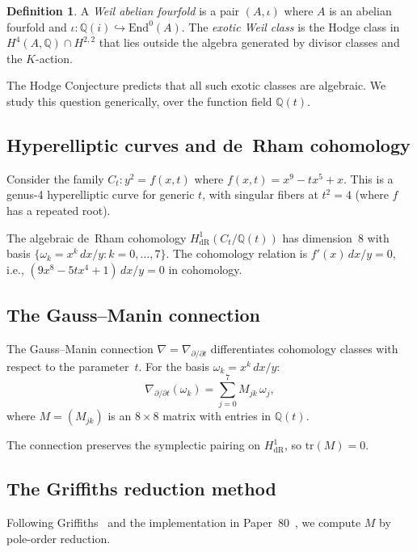 \documentclass[11pt]{article}
\theoremstyle{plain}
\theoremstyle{definition}
\newtheorem{definition}[theorem]{Definition}
\theoremstyle{remark}
\newcommand{\Q}{\mathbb{Q}}
\newcommand{\End}{\mathrm{End}}
\newcommand{\tr}{\mathrm{tr}}
\newcommand{\HdR}{H^1_{\mathrm{dR}}}
\begin{document}
\begin{definition}
A \emph{Weil abelian fourfold} is a pair $(A, \iota)$ where $A$ is
an abelian fourfold and $\iota\colon \Q(i) \hookrightarrow \End^0(A)$.
The \emph{exotic Weil class} is the Hodge class in
$H^4(A, \Q) \cap H^{2,2}$ that lies outside the algebra generated
by divisor classes and the $K$-action.
\end{definition}

The Hodge Conjecture predicts that all such exotic classes are
algebraic. We study this question generically, over the function
field $\Q(t)$.

\subsection{Hyperelliptic curves and de~Rham cohomology}

Consider the family $C_t\colon y^2 = f(x,t)$ where
$f(x,t) = x^9 - tx^5 + x$. This is a genus-4 hyperelliptic curve
for generic $t$, with singular fibers at $t^2 = 4$ (where $f$ has
a repeated root).

The algebraic de~Rham cohomology $\HdR(C_t/\Q(t))$ has dimension~8
with basis $\{\omega_k = x^k\, dx/y : k = 0,\ldots,7\}$. The
cohomology relation is $f'(x)\, dx/y = 0$, i.e.,
$(9x^8 - 5tx^4 + 1)\, dx/y = 0$ in cohomology.

\subsection{The Gauss--Manin connection}\label{sec:GM}

The Gauss--Manin connection $\nabla = \nabla_{\partial/\partial t}$
differentiates cohomology classes with respect to the parameter~$t$.
For the basis $\omega_k = x^k\, dx/y$:
\[
  \nabla_{\partial/\partial t}(\omega_k) = \sum_{j=0}^{7} M_{jk}\, \omega_j,
\]
where $M = (M_{jk})$ is an $8 \times 8$ matrix with entries in $\Q(t)$.

The connection preserves the symplectic pairing on $\HdR$, so
$\tr(M) = 0$.

\subsection{The Griffiths reduction method}\label{sec:griffiths}

Following Griffiths~\cite{Griffiths1969} and the implementation in
Paper~80~\cite{Lee2026p80}, we compute $M$ by pole-order reduction.
\end{document}
